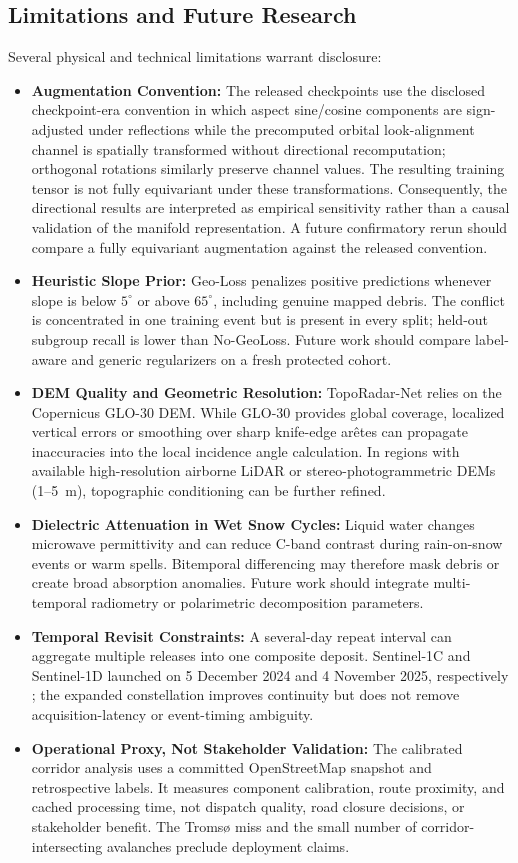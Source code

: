 \subsection{Limitations and Future Research}
\label{sec:disc:limitations}

Several physical and technical limitations warrant disclosure:
\begin{itemize}
    \item \textbf{Augmentation Convention:} The released checkpoints use the disclosed checkpoint-era convention in which aspect sine/cosine components are sign-adjusted under reflections while the precomputed orbital look-alignment channel is spatially transformed without directional recomputation; orthogonal rotations similarly preserve channel values. The resulting training tensor is not fully equivariant under these transformations. Consequently, the directional results are interpreted as empirical sensitivity rather than a causal validation of the manifold representation. A future confirmatory rerun should compare a fully equivariant augmentation against the released convention.
    \item \textbf{Heuristic Slope Prior:} Geo-Loss penalizes positive predictions whenever slope is below $5^\circ$ or above $65^\circ$, including genuine mapped debris. The conflict is concentrated in one training event but is present in every split; held-out subgroup recall is lower than No-GeoLoss. Future work should compare label-aware and generic regularizers on a fresh protected cohort.
    \item \textbf{DEM Quality and Geometric Resolution:} TopoRadar-Net relies on the Copernicus GLO-30 DEM. While GLO-30 provides global coverage, localized vertical errors or smoothing over sharp knife-edge ar{\^e}tes can propagate inaccuracies into the local incidence angle calculation. In regions with available high-resolution airborne LiDAR or stereo-photogrammetric DEMs (1--5~m), topographic conditioning can be further refined.
    \item \textbf{Dielectric Attenuation in Wet Snow Cycles:} Liquid water changes microwave permittivity and can reduce C-band contrast during rain-on-snow events or warm spells. Bitemporal differencing may therefore mask debris or create broad absorption anomalies. Future work should integrate multi-temporal radiometry or polarimetric decomposition parameters.
    \item \textbf{Temporal Revisit Constraints:} A several-day repeat interval can aggregate multiple releases into one composite deposit. Sentinel-1C and Sentinel-1D launched on 5 December 2024 and 4 November 2025, respectively \citep{esa2026sentinel1}; the expanded constellation improves continuity but does not remove acquisition-latency or event-timing ambiguity.
    \item \textbf{Operational Proxy, Not Stakeholder Validation:} The calibrated corridor analysis uses a committed OpenStreetMap snapshot and retrospective labels. It measures component calibration, route proximity, and cached processing time, not dispatch quality, road closure decisions, or stakeholder benefit. The Troms{\o} miss and the small number of corridor-intersecting avalanches preclude deployment claims.
\end{itemize}
